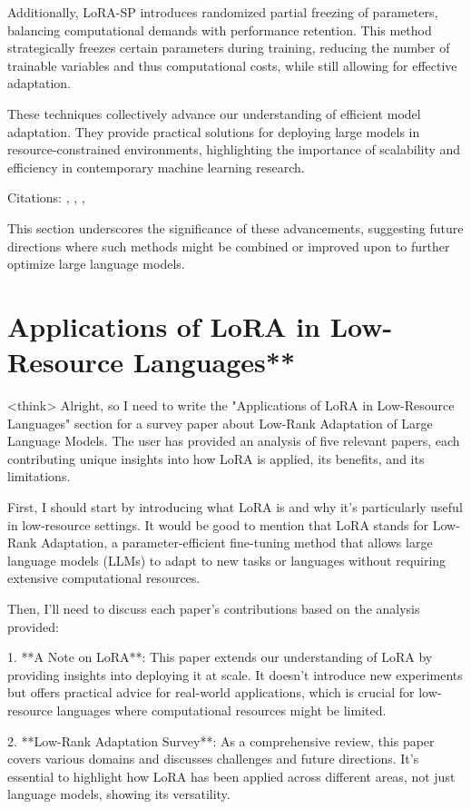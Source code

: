\documentclass[conference]{IEEEtran}
\begin{document}
Additionally, LoRA-SP \cite{b4} introduces randomized partial freezing of parameters, balancing computational demands with performance retention. This method strategically freezes certain parameters during training, reducing the number of trainable variables and thus computational costs, while still allowing for effective adaptation.

These techniques collectively advance our understanding of efficient model adaptation. They provide practical solutions for deploying large models in resource-constrained environments, highlighting the importance of scalability and efficiency in contemporary machine learning research.

Citations: \cite{b1}, \cite{b2}, \cite{b3}, \cite{b4}

This section underscores the significance of these advancements, suggesting future directions where such methods might be combined or improved upon to further optimize large language models.

\section{Applications of LoRA in Low-Resource Languages**}
<think>
Alright, so I need to write the "Applications of LoRA in Low-Resource Languages" section for a survey paper about Low-Rank Adaptation of Large Language Models. The user has provided an analysis of five relevant papers, each contributing unique insights into how LoRA is applied, its benefits, and its limitations.

First, I should start by introducing what LoRA is and why it's particularly useful in low-resource settings. It would be good to mention that LoRA stands for Low-Rank Adaptation, a parameter-efficient fine-tuning method that allows large language models (LLMs) to adapt to new tasks or languages without requiring extensive computational resources.

Then, I'll need to discuss each paper's contributions based on the analysis provided:

1. **A Note on LoRA**: This paper extends our understanding of LoRA by providing insights into deploying it at scale. It doesn't introduce new experiments but offers practical advice for real-world applications, which is crucial for low-resource languages where computational resources might be limited.

2. **Low-Rank Adaptation Survey**: As a comprehensive review, this paper covers various domains and discusses challenges and future directions. It's essential to highlight how LoRA has been applied across different areas, not just language models, showing its versatility.
\end{document}
